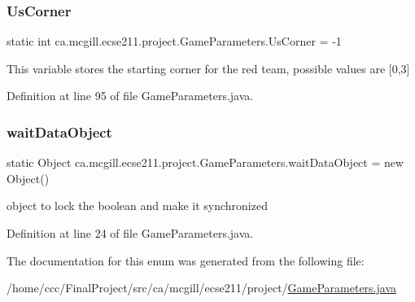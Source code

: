 \mbox{\label{enumca_1_1mcgill_1_1ecse211_1_1project_1_1_game_parameters_a5268b4efd3f069f08cca810e309b51dd}} 
\subsubsection{\texorpdfstring{Us\+Corner}{UsCorner}}
{\footnotesize\ttfamily  static  int ca.\+mcgill.\+ecse211.\+project.\+Game\+Parameters.\+Us\+Corner = -\/1\hspace{0.3cm}{\ttfamily [static]}}

This variable stores the starting corner for the red team, possible values are \mbox{[}0,3\mbox{]} 

Definition at line 95 of file Game\+Parameters.\+java.

\mbox{\label{enumca_1_1mcgill_1_1ecse211_1_1project_1_1_game_parameters_a80acbb2b7423c79211e7eb1bd4df8545}} 
\subsubsection{\texorpdfstring{wait\+Data\+Object}{waitDataObject}}
{\footnotesize\ttfamily  static  Object ca.\+mcgill.\+ecse211.\+project.\+Game\+Parameters.\+wait\+Data\+Object = new Object()\hspace{0.3cm}{\ttfamily [static]}}

object to lock the boolean and make it synchronized 

Definition at line 24 of file Game\+Parameters.\+java.



The documentation for this enum was generated from the following file\+:\begin{DoxyCompactItemize}
\item 
/home/ccc/\+Final\+Project/src/ca/mcgill/ecse211/project/\hyperlink{_game_parameters_8java}{Game\+Parameters.\+java}\end{DoxyCompactItemize}
